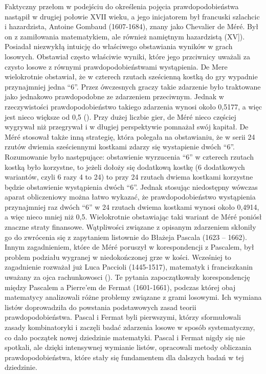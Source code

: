 \documentclass[
  letterpaper,
  DIV=11,
  numbers=noendperiod]{scrreprt}
\begin{document}
Faktyczny przełom w podejściu do określenia pojęcia prawdopodobieństwa
nastąpił w drugiej połowie XVII wieku, a jego inicjatorem był francuski
szlachcic i hazardzista, Antoine Gombaud (1607-1684), znany jako
Chevalier de Méré. Był on z zamiłowania matematykiem, ale również
namiętnym hazardzistą (\citeproc{ref-bernstein1997}{Bernstein et al.,
1997}{[}XV{]}). Posiadał niezwykłą intuicję do właściwego obstawiania
wyników w grach losowych. Obstawiał często właściwie wyniki, które jego
przciwnicy uważali za czysto losowe z równymi prawdopodobieństwami
wystąpienia. De Mere wielokrotnie obstawiał, że w czterech rzutach
sześcienną kostką do gry wypadnie przynajmniej jedna ``6''. Przez
ówczesnych graczy takie zdarzenie było traktowane jako jednakowo
prawdopodobne ze zdarzeniem przeciwnym. Jednak w rzeczywistości
prawdopodobieństwo takiego zdarzenia wynosi około 0,5177, a więc jest
nieco większe od 0,5 (). Przy
dużej liczbie gier, de Méré nieco częściej wygrywał niż przegrywał i w
długiej perspektywie pomnażał swój kapitał. De Méré stosował także inną
strategię, która polegała na obstawianiu, że w serii 24 rzutów dwiemia
sześciennymi kostkami zdarzy się wystapienie dwóch ``6''. Rozumowanie
było następujące: obstawienie wyrzucenia ``6'' w czterech rzutach kostką
było korzystne, to jeżeli dołoży się dodatkową kostkę (6 dodatkowych
wariantów, czyli 6 razy 4 to 24) to przy 24 rzutach dwiema kostkami
korzystne będzie obstawienie wystąpienia dwóch ``6''. Jednak stosując
niedostępny wówczas aparat obliczeniowy można łatwo wykazać, że
prawdopodobieństwo wystąpienia przynajmniej raz dwóch ``6'' w 24 rzutach
dwiema kostkami wynosi około 0,4914, a więc nieco mniej niż 0,5.
Wielokrotnie obstawiając taki wariant de Méré poniósł znaczne straty
finansowe. Wątpliwości związane z opisanym zdarzeniem skłoniły go do
zwrócenia się z zapytaniem listownie do Błażeja Pascala (1623 -- 1662).
Innym zagadnieniem, które de Méré poruszył w korespondencji z Pascalem,
był problem podziału wygranej w niedokończonej grze w kości. Wcześniej
to zagadnienie rozważał już Luca Paccioli (1445-1517), matematyk i
franciszkanin uważany za ojca rachunkowosci
(). Te pytania zapoczątkowały korespondencję między Pascalem
a Pierre'em de Fermat (1601-1661), podczas której obaj matematycy
analizowali różne problemy związane z grami losowymi. Ich wymiana listów
doprowadziła do powstania podstawowych zasad teorii prawdopodobieństwa.
Pascal i Fermat byli pierwszymi, którzy sformułowali zasady
kombinatoryki i zaczęli badać zdarzenia losowe w sposób systematyczny,
co dało początek nowej dziedzinie matematyki. Pascal i Fermat nigdy się
nie spotkali, ale dzięki intensywnej wymianie listów, opracowali metody
obliczania prawdopodobieństwa, które stały się fundamentem dla dalszych
badań w tej dziedzinie.
\end{document}
